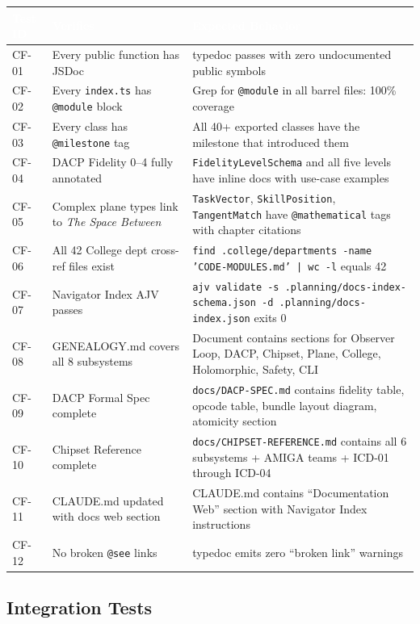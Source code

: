 \documentclass[11pt,letterpaper]{article}
\newcommand{\tableheader}[1]{\textbf{\sffamily\textcolor{white}{#1}}}
\begin{document}
\begin{center}
\begin{tabularx}{\textwidth}{C{1.5cm}L{4cm}X}
\toprule
{}
\tableheader{Test ID} & \tableheader{Verifies} & \tableheader{Expected Behavior} \\
\midrule
CF-01 & Every public function has JSDoc & typedoc passes with zero undocumented public symbols \\
CF-02 & Every \texttt{index.ts} has \texttt{@module} block & Grep for \texttt{@module} in all barrel files: 100\% coverage \\
CF-03 & Every class has \texttt{@milestone} tag & All 40+ exported classes have the milestone that introduced them \\
CF-04 & DACP Fidelity 0--4 fully annotated & \texttt{FidelityLevelSchema} and all five levels have inline docs with use-case examples \\
CF-05 & Complex plane types link to \textit{The Space Between} & \texttt{TaskVector}, \texttt{SkillPosition}, \texttt{TangentMatch} have \texttt{@mathematical} tags with chapter citations \\
CF-06 & All 42 College dept cross-ref files exist & \texttt{find .college/departments -name 'CODE-MODULES.md' | wc -l} equals 42 \\
CF-07 & Navigator Index AJV passes & \texttt{ajv validate -s .planning/docs-index-schema.json -d .planning/docs-index.json} exits 0 \\
CF-08 & GENEALOGY.md covers all 8 subsystems & Document contains sections for Observer Loop, DACP, Chipset, Plane, College, Holomorphic, Safety, CLI \\
CF-09 & DACP Formal Spec complete & \texttt{docs/DACP-SPEC.md} contains fidelity table, opcode table, bundle layout diagram, atomicity section \\
CF-10 & Chipset Reference complete & \texttt{docs/CHIPSET-REFERENCE.md} contains all 6 subsystems + AMIGA teams + ICD-01 through ICD-04 \\
CF-11 & CLAUDE.md updated with docs web section & CLAUDE.md contains ``Documentation Web'' section with Navigator Index instructions \\
CF-12 & No broken \texttt{@see} links & typedoc emits zero ``broken link'' warnings \\
\bottomrule
\end{tabularx}
\end{center}

\subsection{Integration Tests}
\end{document}
